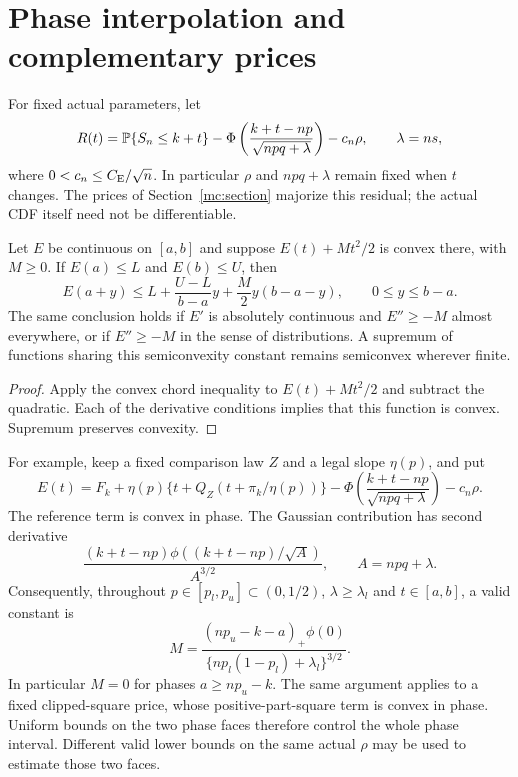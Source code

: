 \section{Phase interpolation and complementary prices}\label{pp:section}

For fixed actual parameters, let
\begin{equation}\label{pp:actual-residual}
 R(t)=\mathbb P\{S_n\le k+t\}
 -\Phi\left(\frac{k+t-np}{\sqrt{npq+\lambda}}\right)-c_n\rho,
 \qquad \lambda=ns,
\end{equation}
where $0<c_n\le C_{\mathrm E}/\sqrt n$. In particular $\rho$ and
$npq+\lambda$ remain fixed when $t$ changes.
The prices of Section~\ref{mc:section} majorize this residual;
the actual CDF itself need not be differentiable.

\begin{lemma}\label{pp:chord}
Let $E$ be continuous on $[a,b]$ and suppose
$E(t)+Mt^2/2$ is convex there, with $M\ge0$.
If $E(a)\le L$ and $E(b)\le U$, then
\begin{equation}\label{pp:chord-bound}
 E(a+y)\le L+\frac{U-L}{b-a}y
                   +\frac M2y(b-a-y),\qquad 0\le y\le b-a.
\end{equation}
The same conclusion holds if $E'$ is absolutely continuous and
$E''\ge-M$ almost everywhere, or if $E''\ge-M$ in the sense of
distributions. A supremum of functions sharing this semiconvexity
constant remains semiconvex wherever finite.
\end{lemma}
\begin{proof}
Apply the convex chord inequality to $E(t)+Mt^2/2$ and subtract
the quadratic. Each of the derivative conditions implies that
this function is convex. Supremum preserves convexity.
\end{proof}

For example, keep a fixed comparison law $Z$ and a legal slope
$\eta(p)$, and put
\[
 E(t)=F_k+\eta(p)\{t+Q_Z(t+\pi_k/\eta(p))\}
 -\Phi\left(\frac{k+t-np}{\sqrt{npq+\lambda}}\right)-c_n\rho.
\]
The reference term is convex in phase. The Gaussian contribution
has second derivative
\[
 \frac{(k+t-np)\phi((k+t-np)/\sqrt A)}{A^{3/2}},
 \qquad A=npq+\lambda.
\]
Consequently, throughout $p\in[p_l,p_u]\subset(0,1/2)$,
$\lambda\ge\lambda_l$ and $t\in[a,b]$, a valid constant is
\begin{equation}\label{pp:gaussian-curvature}
 M=\frac{(np_u-k-a)_+\phi(0)}
          {\{np_l(1-p_l)+\lambda_l\}^{3/2}}.
\end{equation}
In particular $M=0$ for phases $a\ge np_u-k$.
The same argument applies to a fixed clipped-square price,
whose positive-part-square term is convex in phase.
Uniform bounds on the two phase faces therefore control the whole
phase interval. Different valid lower bounds on the same actual
$\rho$ may be used to estimate those two faces.

